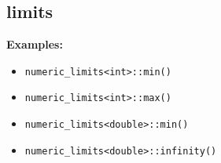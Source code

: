 \subsection{limits}
\textbf{Examples:}
\begin{itemize}
\item \texttt{numeric\_limits<int>::min()}
\item \texttt{numeric\_limits<int>::max()}
\item \texttt{numeric\_limits<double>::min()}
\item \texttt{numeric\_limits<double>::infinity()}
\end{itemize}
